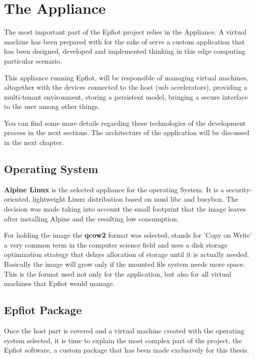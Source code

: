 \section{The Appliance}
\label{makereference3.2}
The most important part of the Epfiot project relies in the Appliance. A virtual machine has been prepared with for the sake of serve a custom application that has been designed, developed and implemented thinking in this edge computing particular scenario.

This appliance running Epfiot, will be responsible of managing virtual machines, altogether with the devices connected to the host (usb accelerators), providing a multi-tenant environment, storing a persistent model, bringing a secure interface to the user among other things.

You can find some more details regarding these technologies of the development process in the next sections. The architecture of the application will be discussed in the next chapter.

\subsection{Operating System}
\label{makereference3.2.1}
\textbf{Alpine Linux} is the selected appliance for the operating System. It is a security-oriented, lightweight Linux distribution based on musl libc and busybox.
The decision was made taking into account the small footprint that the image leaves after installing Alpine and the resulting low consumption. 

For holding the image the \textbf{qcow2} format was selected, stands for 'Copy on Write' a very common term in the computer science field and uses a disk storage optimization strategy that delays allocation of storage until it is actually needed. Basically the image will grow only if the mounted file system needs more space. This is the format used not only for the application, but also for all virtual machines that Epfiot would manage.

\subsection{Epfiot Package}
\label{makereference3.2.2}

Once the host part is covered and a virtual machine created with the operating system selected, it is time to explain the most complex part of the project, the Epfiot software, a custom package that has been made exclusively for this thesis. 

